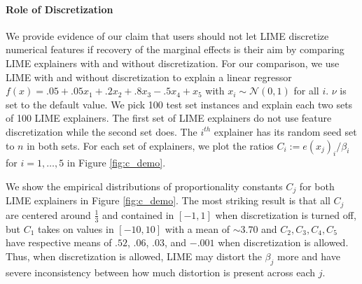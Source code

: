 \documentclass[mnsc,blindrev]{informs3}
\begin{document}
                \paragraph{Role of Discretization}
                    We provide evidence of our claim that users should not let LIME discretize numerical features if recovery of the marginal effects is their aim by comparing LIME explainers with and without discretization. For our comparison, we use LIME with and without discretization to explain a linear regressor $f(x) = .05 + .05x_1+ .2x_2+ .8x_3 -.5x_4 +x_5$ with $x_i \sim \mathcal{N}(0,1)$ for all $i$. $\nu$ is set to the default value. We pick 100 test set instances and explain each two sets of 100 LIME explainers. The first set of LIME explainers do not use feature discretization while the second set does. The $i^{th}$ explainer has its random seed set to $n$ in both sets. For each set of explainers, we plot the ratios $C_i:= e(x_j)_i/\beta_i$ for $i=1,\ldots,5$ in Figure \ref{fig:c_demo}.


                We show the empirical distributions of proportionality constants $C_j$ for both LIME explainers in Figure \ref{fig:c_demo}. The most striking result is that all $C_j$ are centered around $\frac{1}{3}$ and contained in $[-1,1]$ when discretization is turned off, but $C_1$ takes on values in $[-10,10]$ with a mean of $\sim 3.70$ and $C_2,C_3,C_4,C_5$ have respective means of $.52$, $.06$, $.03$, and $-.001$ when discretization is allowed. Thus, when discretization is allowed, LIME may distort the $\beta_j$ more and have severe inconsistency between how much distortion is present across each $j$.
                
\end{document}
